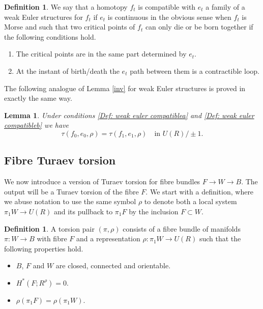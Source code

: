 \documentclass[JEP,XML,SOM,Unicode,NoFloatCountersInSection]{cedram}
\newenvironment{enumeratea}
{\bgroup\def\theenumi{\alph{enumi}}\begin{enumerate}}
{\end{enumerate}\egroup}
\theoremstyle{plain}
\newtheorem{lemma}[theorem]{Lemma}
\theoremstyle{definition}
\newtheorem{definition}[theorem]{Definition}
\begin{document}
\begin{definition}\label{Def: weak euler compatible} We say that a homotopy $f_t$ is compatible with $e_t$ a family of a weak Euler structures for $f_t$ if $e_t$ is continuous in the obvious sense when $f_t$ is Morse and such that two critical points of $f_t$ can only die or be born together if the following conditions hold.

\begin{enumeratea}
\item\label{Def: weak euler compatiblea}
The critical points are in the same part determined by $e_t$.
\item\label{Def: weak euler compatibleb}
At the instant of birth/death the $e_t$ path between them is a contractible loop.
\end{enumeratea}
\end{definition}

The following analogue of Lemma \ref{inv} for weak Euler structures is proved in exactly the same way.
\begin{lemma}\label{weakinv}
Under conditions \eqref{Def: weak euler compatiblea} and \eqref{Def: weak euler compatibleb} we have
\[
\tau(f_0,e_0, \rho)=\tau(f_1,e_1, \rho)\quad\text{in }U(R) / \pm1.
\]
\end{lemma}

\subsection{Fibre Turaev torsion}

We now introduce a version of Turaev torsion for fibre bundles $F \to W \to B$. The output will be a Turaev torsion of the fibre $F$. We start with a definition, where we abuse notation to use the same symbol $\rho$ to denote both a local system $\pi_1 W \to U(R)$ and its pullback to $\pi_1F$ by the inclusion $F \subset W$.

\begin{definition}\label{torsionpair}
A torsion pair $(\pi, \rho)$ consists of a fibre bundle of manifolds \hbox{$\pi: W \to B$} with fibre $F$ and a representation $\rho: \pi_1W \to U(R)$ such that the following properties hold.
\begin{itemize}
\item $B$, $F$ and $W$ are closed, connected and orientable.
\item $H^*(F; R^\rho)=0$.
\item $\rho(\pi_1F)=\rho(\pi_1W)$.
\end{itemize}
\end{definition}
\end{document}
